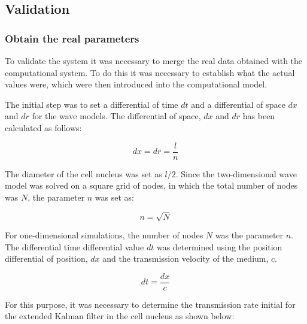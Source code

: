 \subsection{Validation}

\subsubsection{Obtain the real parameters}

To validate the system it was necessary to merge the real data obtained with the computational system. To do this it was necessary to establish what the actual values were, which were then introduced into the computational model.

\setlength{\parskip}{4mm}

The initial step was to set a differential of time $dt$ and a differential of space $dx$ and $dr$ for the wave models. The differential of space, $dx$ and $dr$ has been calculated as follows:

\begin{equation} \label{eqn:dx}
	dx = dr = \frac{l}{n}
\end{equation}

The diameter of the cell nucleus was set as $l/2$. Since the two-dimensional wave model was solved on a square grid of nodes, in which the total number of nodes was $N$, the parameter $n$ was set as:

\begin{equation} \label{eqn:n}
	n = \sqrt{N}
\end{equation}

For one-dimensional simulations, the number of nodes $N$ was the parameter $n$. The differential time differential value $dt$ was determined using the position differential of position, $dx$ and the transmission velocity of the medium, $c$.

\begin{equation} \label{eqn:dt}
	dt = \frac{dx}{c}
\end{equation}

For this purpose, it was necessary to determine the transmission rate initial for the extended Kalman filter in the cell nucleus as shown below:

